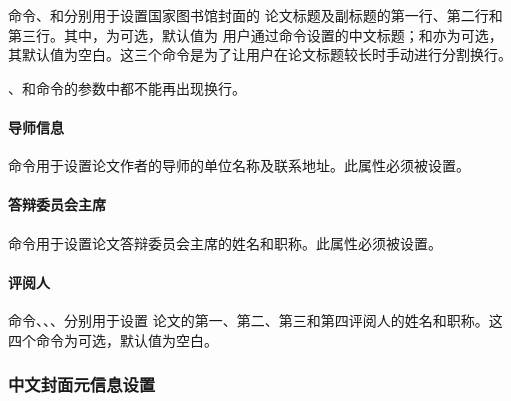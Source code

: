 命令、和分别用于设置国家图书馆封面的
论文标题及副标题的第一行、第二行和第三行。其中，为可选，默认值为
用户通过命令设置的中文标题；和亦为可选，
其默认值为空白。这三个命令是为了让用户在论文标题较长时手动进行分割换行。
\begin{tex}
\end{tex}

\begin{note}
、和命令的参数中都不能再出现换行。
\end{note}

\paragraph{导师信息}

命令用于设置论文作者的导师的单位名称及联系地址。此属性必须被设置。
\begin{tex}
\end{tex}

\paragraph{答辩委员会主席}

命令用于设置论文答辩委员会主席的姓名和职称。此属性必须被设置。
\begin{tex}
\end{tex}

\paragraph{评阅人}

命令、、、分别用于设置
论文的第一、第二、第三和第四评阅人的姓名和职称。这四个命令为可选，默认值为空白。
\begin{tex}
\end{tex}

\subsubsection{中文封面元信息设置}

